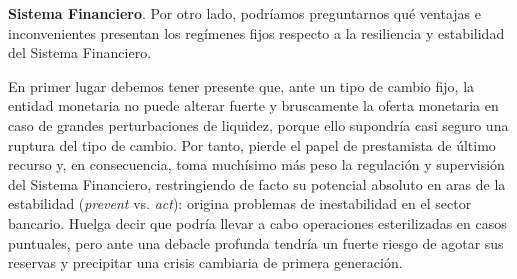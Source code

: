 \documentclass[10pt,a4paper]{article}
\begin{document}
\textbf{Sistema Financiero}. Por otro lado, podríamos preguntarnos qué ventajas e inconvenientes presentan los regímenes fijos respecto a la resiliencia y estabilidad del Sistema Financiero. 

En primer lugar debemos tener presente que, ante un tipo de cambio fijo, la entidad monetaria no puede alterar fuerte y bruscamente la oferta monetaria en caso de grandes perturbaciones de liquidez, porque ello supondría casi seguro una ruptura del tipo de cambio. Por tanto, pierde el papel de prestamista de último recurso y, en consecuencia, toma muchísimo más peso la regulación y supervisión del Sistema Financiero, restringiendo de facto su potencial absoluto en aras de la estabilidad (\textit{prevent} vs. \textit{act}): origina problemas de inestabilidad en el sector bancario. Huelga decir que podría llevar a cabo operaciones esterilizadas en casos puntuales, pero ante una debacle profunda tendría un fuerte riesgo de agotar sus reservas y precipitar una crisis cambiaria de primera generación.
\end{document}
